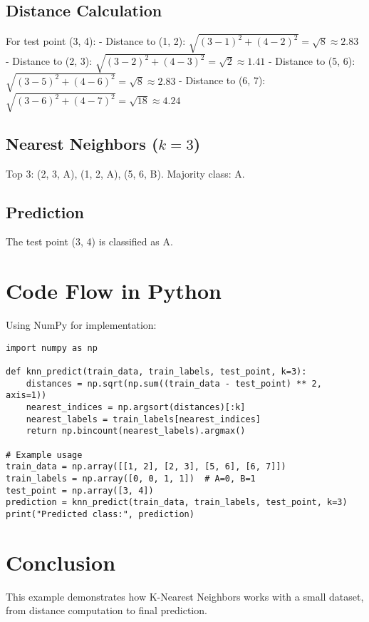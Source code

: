 \documentclass{article}
\newcommand{\knn}{K-Nearest Neighbors}
\begin{document}
\subsection{Distance Calculation}
For test point (3, 4):
- Distance to (1, 2): $\sqrt{(3-1)^2 + (4-2)^2} = \sqrt{8} \approx 2.83$
- Distance to (2, 3): $\sqrt{(3-2)^2 + (4-3)^2} = \sqrt{2} \approx 1.41$
- Distance to (5, 6): $\sqrt{(3-5)^2 + (4-6)^2} = \sqrt{8} \approx 2.83$
- Distance to (6, 7): $\sqrt{(3-6)^2 + (4-7)^2} = \sqrt{18} \approx 4.24$

\subsection{Nearest Neighbors ($k=3$)}
Top 3: (2, 3, A), (1, 2, A), (5, 6, B). Majority class: A.

\subsection{Prediction}
The test point (3, 4) is classified as A.

\section{Code Flow in Python}
Using NumPy for implementation:
\begin{verbatim}
import numpy as np

def knn_predict(train_data, train_labels, test_point, k=3):
    distances = np.sqrt(np.sum((train_data - test_point) ** 2, axis=1))
    nearest_indices = np.argsort(distances)[:k]
    nearest_labels = train_labels[nearest_indices]
    return np.bincount(nearest_labels).argmax()

# Example usage
train_data = np.array([[1, 2], [2, 3], [5, 6], [6, 7]])
train_labels = np.array([0, 0, 1, 1])  # A=0, B=1
test_point = np.array([3, 4])
prediction = knn_predict(train_data, train_labels, test_point, k=3)
print("Predicted class:", prediction)
\end{verbatim}

\section{Conclusion}
This example demonstrates how \knn{} works with a small dataset, from distance computation to final prediction.
\end{document}

